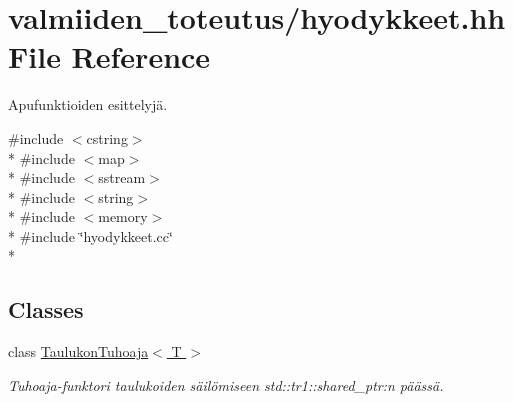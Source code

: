 \hypertarget{hyodykkeet_8hh}{}\section{valmiiden\+\_\+toteutus/hyodykkeet.hh File Reference}
\label{hyodykkeet_8hh}


Apufunktioiden esittelyjä.  


{\ttfamily \#include $<$cstring$>$}\\*
{\ttfamily \#include $<$map$>$}\\*
{\ttfamily \#include $<$sstream$>$}\\*
{\ttfamily \#include $<$string$>$}\\*
{\ttfamily \#include $<$memory$>$}\\*
{\ttfamily \#include \char`\"{}hyodykkeet.\+cc\char`\"{}}\\*
\subsection*{Classes}
\begin{DoxyCompactItemize}
\item 
class \hyperlink{class_taulukon_tuhoaja}{Taulukon\+Tuhoaja$<$ T $>$}
\begin{DoxyCompactList}\small\item\em Tuhoaja-\/funktori taulukoiden säilömiseen std\+::tr1\+::shared\+\_\+ptr\+:n päässä. \end{DoxyCompactList}\end{DoxyCompactItemize}
